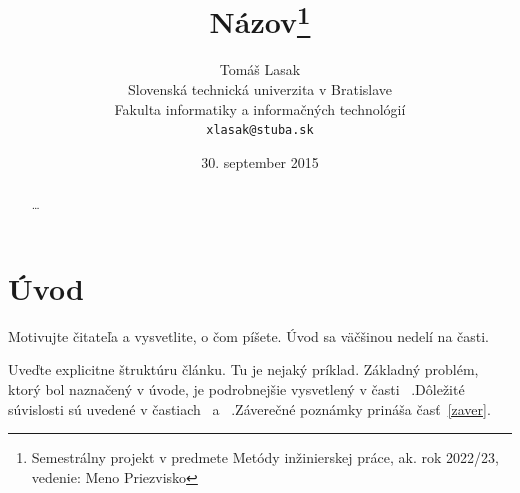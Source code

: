 \documentclass[10pt,twoside,slovak,a4paper]{article}
\title{Názov\thanks{Semestrálny projekt v predmete Metódy inžinierskej práce, ak. rok 2022/23, vedenie: Meno Priezvisko}} %
\author{Tomáš Lasak\\[2pt]
	{\small Slovenská technická univerzita v Bratislave}\\
	{\small Fakulta informatiky a informačných technológií}\\
	{\small \texttt{xlasak@stuba.sk}}
	}
\date{\small 30. september 2015} %
\begin{document}
\maketitle

\begin{abstract}
	\ldots
\end{abstract}

\section{Úvod}

Motivujte čitateľa a vysvetlite, o čom píšete. Úvod sa väčšinou nedelí na časti.

Uveďte explicitne štruktúru článku. Tu je nejaký príklad.
Základný problém, ktorý bol naznačený v úvode, je podrobnejšie vysvetlený v časti~
.Dôležité súvislosti sú uvedené v častiach~
 a~
.Záverečné poznámky prináša časť~\ref{zaver}.



\end{document}
